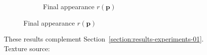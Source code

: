 \begin{figure}[]
\begin{subfigure}{\textwidth}
\begin{subfigure}{0.24\textwidth}
            \caption*{Final appearance \(r(\bm{p})\)}
        \end{subfigure}
    \end{subfigure}
    \caption{These results complement Section~\ref{section:results-experiments-01}. Texture source: \citet{Pixar128}}
    \label{fig:ex01-complete-flowers-1000steps}
\end{figure}

